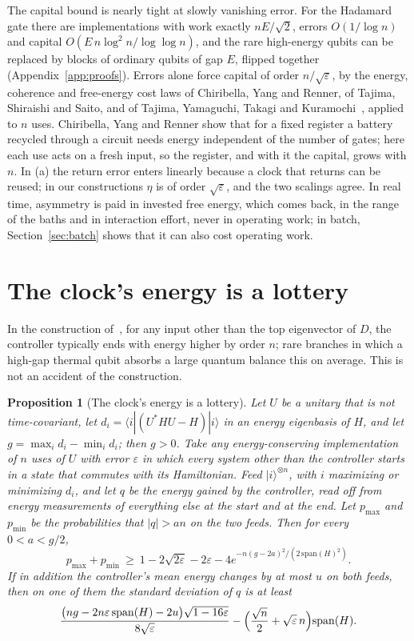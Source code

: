 \documentclass[11pt]{article}
\newtheorem{proposition}[theorem]{Proposition}
\theoremstyle{definition}
\theoremstyle{remark}
\begin{document}
The capital bound is nearly tight at slowly vanishing error. For the Hadamard gate there are implementations with work exactly $nE/\sqrt2$, errors $O(1/\log n)$ and capital $O(E\,n\log^2n/\log\log n)$, and the rare high-energy qubits can be replaced by blocks of ordinary qubits of gap $E$, flipped together (Appendix~\ref{app:proofs}). Errors alone force capital of order $n/\sqrt\varepsilon$, by the energy, coherence and free-energy cost laws of Chiribella, Yang and Renner, of Tajima, Shiraishi and Saito, and of Tajima, Yamaguchi, Takagi and Kuramochi~\cite{ChiribellaYangRenner21,TSS20,TYTK25}, applied to $n$ uses. Chiribella, Yang and Renner show that for a fixed register a battery recycled through a circuit needs energy independent of the number of gates; here each use acts on a fresh input, so the register, and with it the capital, grows with $n$. In (a) the return error enters linearly because a clock that returns can be reused; in our constructions $\eta$ is of order $\sqrt\varepsilon$, and the two scalings agree. In real time, asymmetry is paid in invested free energy, which comes back, in the range of the baths and in interaction effort, never in operating work; in batch, Section~\ref{sec:batch} shows that it can also cost operating work.

\section{The clock's energy is a lottery}\label{sec:lottery}

In the construction of~\cite{SaveWork}, for any input other than the top eigenvector of $D$, the controller typically ends with energy higher by order $n$; rare branches in which a high-gap thermal qubit absorbs a large quantum balance this on average. This is not an accident of the construction.

\begin{proposition}[The clock's energy is a lottery]\label{prop:lottery}
Let $U$ be a unitary that is not time-covariant, let $d_i=\langle i|(U^*HU-H)|i\rangle$ in an energy eigenbasis of $H$, and let $g=\max_id_i-\min_id_i$; then $g>0$. Take any energy-conserving implementation of $n$ uses of $U$ with error $\varepsilon$ in which every system other than the controller starts in a state that commutes with its Hamiltonian. Feed $|i\rangle^{\otimes n}$, with $i$ maximizing or minimizing $d_i$, and let $q$ be the energy gained by the controller, read off from energy measurements of everything else at the start and at the end. Let $p_{\max}$ and $p_{\min}$ be the probabilities that $|q|>an$ on the two feeds. Then for every $0<a<g/2$,
\[
p_{\max}+p_{\min}\ \ge\ 1-2\sqrt{2\varepsilon}-2\varepsilon-4e^{-n(g-2a)^2/(2\,\mathrm{span}(H)^2)}.
\]
If in addition the controller's mean energy changes by at most $u$ on both feeds, then on one of them the standard deviation of $q$ is at least
\[
\frac{\bigl(ng-2n\varepsilon\,\mathrm{span}(H)-2u\bigr)\sqrt{1-16\varepsilon}}{8\sqrt\varepsilon}-\Bigl(\frac{\sqrt n}2+\sqrt\varepsilon\,n\Bigr)\mathrm{span}(H).
\]
\end{proposition}
\end{document}
